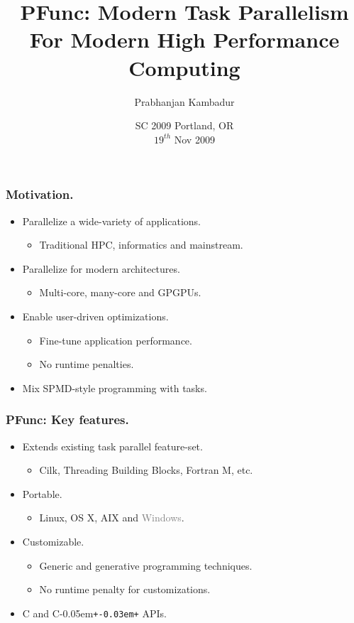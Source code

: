\documentclass{beamer}
\title{PFunc: Modern Task Parallelism For Modern High Performance Computing}
\author{Prabhanjan Kambadur}
\date{{\small SC 2009}
{\footnotesize Portland, OR}\\
$19^{th}$ Nov 2009}
\newcommand{\Cpp}{C\kern-0.05em\texttt{+\kern-0.03em+}}
\begin{document}
\begin{frame}
  \titlepage
\end{frame}

\begin{frame}
\frametitle{Motivation.}
\begin{itemize}
\item Parallelize a wide-variety of applications.
  \begin{itemize}
  \item Traditional HPC, informatics and mainstream.
  \end{itemize}
\item Parallelize for modern architectures.
  \begin{itemize}
  \item Multi-core, many-core and GPGPUs.
  \end{itemize}
\item Enable user-driven optimizations.
  \begin{itemize}
  \item Fine-tune application performance.
  \item No runtime penalties.
  \end{itemize}
\item Mix SPMD-style programming with tasks.
\end{itemize}
\end{frame}

\begin{frame}
\frametitle{PFunc: Key features.}
\begin{itemize}
\item Extends existing task parallel feature-set. 
  \begin{itemize}
  \item Cilk, Threading Building Blocks, Fortran M, etc.
  \end{itemize}
\item Portable.
  \begin{itemize}
  \item Linux, OS X, AIX and \textcolor{gray}{Windows}.
  \end{itemize}
\item Customizable.
  \begin{itemize}
  \item Generic and generative programming techniques.
  \item No runtime penalty for customizations.
  \end{itemize}
\item C and \Cpp{} APIs.
\end{itemize}
\end{frame}
\end{document}

